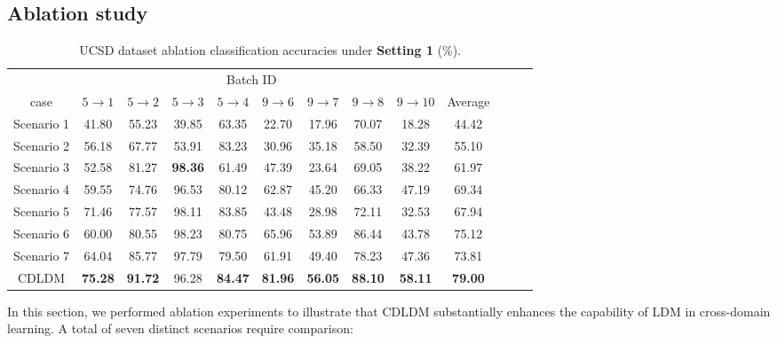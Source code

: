 \documentclass[a4paper]{cas-sc}
\begin{document}
\subsection{Ablation study} \label{Abla}
\begin{table}[ht]
\centering
\setlength{\abovecaptionskip}{0pt}
\caption{UCSD dataset ablation classification accuracies under \textbf{Setting 1} (\%).}
\setlength{\tabcolsep}{3.2 mm}
\begin{tabular}{@{}ccccccccccccc@{}}
\toprule
 \multicolumn{10}{c}{Batch ID}  \\
\cmidrule(lr){2-10}
case & $5 \rightarrow 1$ & $5 \rightarrow 2$ & $5 \rightarrow 3$ & $5 \rightarrow 4$ & $9 \rightarrow 6$ & $9 \rightarrow 7$ & $9 \rightarrow 8$ & $9 \rightarrow 10$ & Average \\
\midrule
Scenario 1 & 41.80 & 55.23 & 39.85 & 63.35 & 22.70 & 17.96 & 70.07 & 18.28 & 44.42 \\
Scenario 2 & 56.18 & 67.77 & 53.91 & 83.23 & 30.96 & 35.18 & 58.50 & 32.39 & 55.10 \\
Scenario 3 & 52.58 & 81.27 & \bfseries{98.36} & 61.49 & 47.39 & 23.64 & 69.05 & 38.22 & 61.97 \\
Scenario 4 & 59.55 & 74.76 & 96.53 & 80.12 & 62.87 & 45.20 & 66.33 & 47.19 & 69.34 \\
Scenario 5 & 71.46 & 77.57 & 98.11 & 83.85 & 43.48 & 28.98 & 72.11 & 32.53 & 67.94 \\
Scenario 6 & 60.00 & 80.55 & 98.23 & 80.75 & 65.96 & 53.89 & 86.44 & 43.78 & 75.12 \\
Scenario 7 & 64.04 & 85.77 & 97.79 & 79.50 & 61.91 & 49.40 & 78.23 & 47.36 & 73.81 \\
CDLDM & \bfseries{75.28} & \bfseries{91.72} & 96.28 & \bfseries{84.47} & \bfseries{81.96} & \bfseries{56.05} & \bfseries{88.10} & \bfseries{58.11} & \bfseries{79.00} \\

\bottomrule
\end{tabular}
\label{ablation}
\end{table}

In this section, we performed ablation experiments to illustrate that CDLDM substantially enhances the capability of LDM in cross-domain learning. A total of seven distinct scenarios require comparison:
\end{document}
